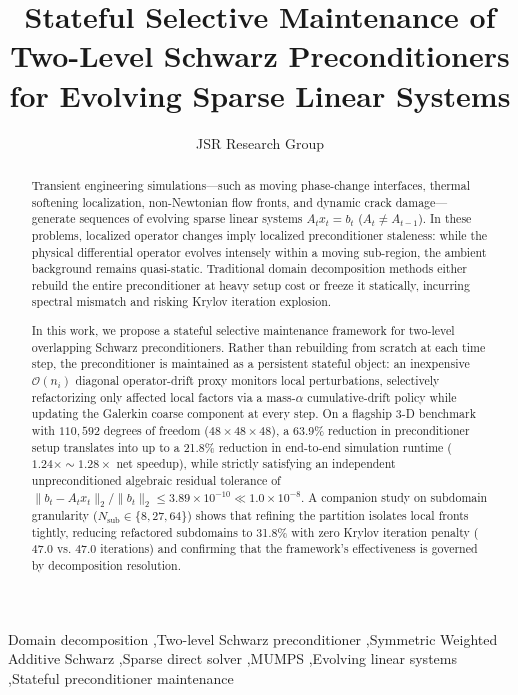 \documentclass[preprint,12pt,3p]{elsarticle}
\begin{document}
\begin{frontmatter}

\title{Stateful Selective Maintenance of Two-Level Schwarz Preconditioners for Evolving Sparse Linear Systems}

\author[inst1]{JSR Research Group}


\begin{abstract}
Transient engineering simulations---such as moving phase-change interfaces, thermal softening localization, non-Newtonian flow fronts, and dynamic crack damage---generate sequences of evolving sparse linear systems $A_t x_t = b_t$ ($A_t \neq A_{t-1}$). In these problems, localized operator changes imply localized preconditioner staleness: while the physical differential operator evolves intensely within a moving sub-region, the ambient background remains quasi-static. Traditional domain decomposition methods either rebuild the entire preconditioner at heavy setup cost or freeze it statically, incurring spectral mismatch and risking Krylov iteration explosion.

In this work, we propose a stateful selective maintenance framework for two-level overlapping Schwarz preconditioners. Rather than rebuilding from scratch at each time step, the preconditioner is maintained as a persistent stateful object: an inexpensive $\mathcal{O}(n_i)$ diagonal operator-drift proxy monitors local perturbations, selectively refactorizing only affected local factors via a mass-$\alpha$ cumulative-drift policy while updating the Galerkin coarse component at every step. On a flagship 3-D benchmark with $110,592$ degrees of freedom ($48 \times 48 \times 48$), a 63.9\% reduction in preconditioner setup translates into up to a 21.8\% reduction in end-to-end simulation runtime ($1.24\times \sim 1.28\times$ net speedup), while strictly satisfying an independent unpreconditioned algebraic residual tolerance of $\|b_t - A_t x_t\|_2 / \|b_t\|_2 \le 3.89 \times 10^{-10} \ll 1.0 \times 10^{-8}$. A companion study on subdomain granularity ($N_{\text{sub}} \in \{8, 27, 64\}$) shows that refining the partition isolates local fronts tightly, reducing refactored subdomains to 31.8\% with zero Krylov iteration penalty ($47.0$ vs. $47.0$ iterations) and confirming that the framework's effectiveness is governed by decomposition resolution.
\end{abstract}

\begin{keyword}
Domain decomposition \sep Two-level Schwarz preconditioner \sep Symmetric Weighted Additive Schwarz \sep Sparse direct solver \sep MUMPS \sep Evolving linear systems \sep Stateful preconditioner maintenance
\end{keyword}

\end{frontmatter}
\end{document}
